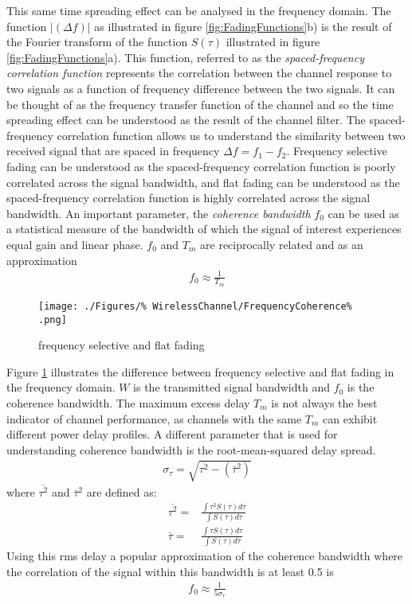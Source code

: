 This same time spreading effect can be analysed in %
the frequency domain. The function $\lvert (\Delta f) %
\rvert$ as illustrated in figure \ref{fig:FadingFunctions}b) %
is the result of the Fourier transform of the function %
$S(\tau)$ illustrated in figure \ref{fig:FadingFunctions}a). %
This function, %
referred to as the \emph{spaced-frequency correlation %
function} represents the correlation between the channel %
response to two signals as a function of frequency %
difference between the two signals. It can be thought of %
as the frequency transfer function of the channel and so %
the time spreading effect can be understood as the result %
of the channel filter.
\FloatBarrier
The spaced-frequency correlation function allows us to %
understand the similarity between two received signal %
that are spaced in frequency $\Delta f = f_{1} - f_{2}$. %
Frequency selective fading can be understood as the %
spaced-frequency correlation function is poorly correlated %
across the signal bandwidth, and flat fading can be understood %
as the spaced-frequency correlation function is highly %
correlated across the signal bandwidth. An important %
parameter, the \emph{coherence bandwidth} $f_{0}$ %
can be used as a statistical measure of the bandwidth %
of which the signal of interest experiences equal gain %
and linear phase. $f_{0}$ and $T_{m}$ are reciprocally %
related and as an approximation
\begin{align}
	f_{0} \approx \frac{1}{T_{m}}
\end{align}
\begin{figure}[ht]
	\texttt{[image: ./Figures/\%
		WirelessChannel/FrequencyCoherence\%
		.png]}
	\caption{frequency selective and flat fading %
	\cite{Sklar01}}
	\label{fig:FadingFigure}
\end{figure}
Figure \ref{fig:FadingFigure} illustrates the difference %
between frequency selective and flat fading in the %
frequency domain. $W$ is the transmitted signal %
bandwidth and $f_{0}$ is the coherence bandwidth.
\FloatBarrier
The maximum excess delay $T_{m}$ is not always the %
best indicator of channel performance, as channels with %
the same $T_{m}$ can exhibit different power delay profiles. %
A different parameter that is used for understanding %
coherence bandwidth is the root-mean-squared delay spread.
\begin{align}
	\sigma_{\tau} = \sqrt{\overline{\tau^{2}} - (\bar{\tau}^{2})}
\end{align}
where $\overline{\tau^{2}}$ and $\bar{\tau}^{2}$ are defined %
as:
\begin{align}
	\overline{\tau^{2}} =&  
	\frac{\int \tau^{2} S(\tau) d\tau}{\int S(\tau) d\tau}
	\\[1.0em]
	\bar{\tau} =& \frac{\int \tau S(\tau) d\tau}{\int S(\tau) 
	d\tau}
\end{align}
Using this rms delay a popular approximation of %
the coherence bandwidth where the correlation %
of the signal within this bandwidth is at least 0.5 is
\begin{align}
	f_{0} \approx \frac{1}{5\sigma_{\tau}}
\end{align}

